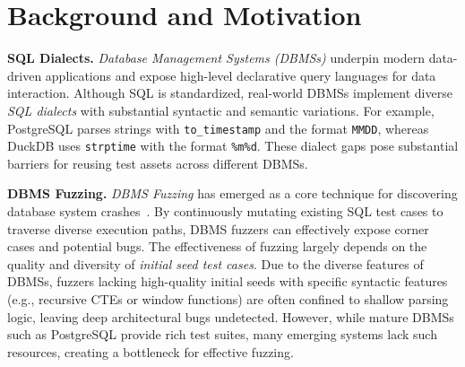 \documentclass[conference]{IEEEtran}
\begin{document}

\section{Background and Motivation}
\label{sec:background}
\textbf{SQL Dialects.} 
\textit{Database Management Systems (DBMSs)} underpin modern data-driven applications and expose high-level declarative query languages for data interaction. Although SQL is standardized, real-world DBMSs implement diverse \textit{SQL dialects} with substantial syntactic and semantic variations.
For example, PostgreSQL parses strings with \texttt{to\_timestamp} and the format \texttt{\textquotesingle{}MMDD\textquotesingle{}}, whereas DuckDB uses \texttt{strptime} with the format \texttt{\textquotesingle{}\%m\%d\textquotesingle{}}.
These dialect gaps pose substantial barriers for reusing test assets across different DBMSs.



\textbf{DBMS Fuzzing.} 
\textit{DBMS Fuzzing} has emerged as a core technique for discovering database system crashes~\cite{sqlsmith, zhong2020squirrel, wang2021industry}. By continuously mutating existing SQL test cases to traverse diverse execution paths, DBMS fuzzers can effectively expose corner cases and potential bugs.
The effectiveness of fuzzing largely depends on the quality and diversity of \textit{initial seed test cases}.
Due to the diverse features of DBMSs, fuzzers lacking high-quality initial seeds with specific syntactic features (e.g., recursive CTEs or window functions) are often confined to shallow parsing logic, leaving deep architectural bugs undetected.
However, while mature DBMSs such as PostgreSQL provide rich test suites, many emerging systems lack such resources, creating a bottleneck for effective fuzzing.
\end{document}
